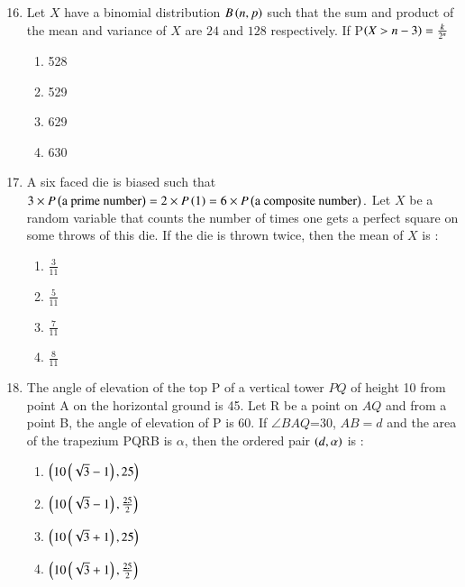 \documentclass[journal]{IEEEtran}
\begin{document}
\begin{enumerate}
\setcounter{enumi}{15}
 
    \item Let $X$ have  a binomial distribution $B\left(n,p\right)$ such that the sum and product of the mean and variance of $X$  are $24$ and $128$ respectively. If P$\left(X>n-3\right)=\frac{k}{2^n}$
\hfill{}
        \begin{multicols}{4}
            \begin{enumerate}
                \item 528
                \item 529
                \item 629
                \item 630
            \end{enumerate}
        \end{multicols}

    \item A six faced die is biased such that $3\times P\left(\text{a prime number}\right)=2\times P\left(1\right)=6\times P\left(\text{a composite number}\right).$ Let $X$ be a random variable that counts the number of times one gets a perfect square on some throws of this die. If the die is thrown twice, then the mean of $X$ is :
\hfill{}
		\begin{multicols}{1}
			\begin{enumerate}
				\item $\frac{3}{11}$
				\item $\frac{5}{11}$
				\item $\frac{7}{11}$
				\item $\frac{8}{11}$
			\end{enumerate}
		\end{multicols}

    \item The angle of elevation of the top P of a vertical tower $PQ$ of height 10 from point A on the horizontal ground is 45\textdegree. Let R be a point on $AQ$ and from a point B, the angle of elevation of P is 60\textdegree. If $\angle BAQ$=30\textdegree, $AB=d$ and the area of the trapezium PQRB is $\alpha$, then the ordered pair $\left(d,\alpha\right)$ is :
   \hfill{}
        \begin{multicols}{1}
            \begin{enumerate}
                \item $\left(10\left(\sqrt{3}-1\right),25\right)$
                \item $\left(10\left(\sqrt{3}-1\right),\frac{25}{2}\right)$
                \item $\left(10\left(\sqrt{3}+1\right),25\right)$
                \item $\left(10\left(\sqrt{3}+1\right),\frac{25}{2}\right)$
            \end{enumerate}
        \end{multicols}


\end{enumerate}
\end{document}
